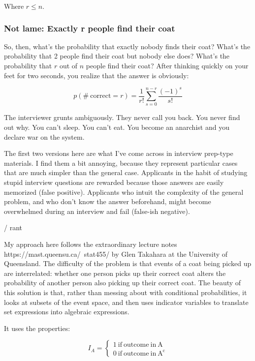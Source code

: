 Where $r\leq n$.

\subsubsection{Not lame: Exactly r people find their coat}
So, then, what's the probability that exactly nobody finds their coat? What's the probability that 2 people find their coat but nobody else does? What's the probability that $r$ out of $n$ people find their coat? After thinking quickly on your feet for two seconds, you realize that the answer is obviously:

\begin{equation}
p(\mathrm{\#\ correct} = r) = \frac{1}{r!}\sum_{s=0}^{n-r} \frac{(-1)^s}{s!}
\end{equation}

The interviewer grunts ambiguously. They never call you back. You never find out why. You can't sleep. You can't eat. You become an anarchist and you declare war on the system.

The first two versions here are what I've come across in interview prep-type materials. I find them a bit annoying, because they represent particular cases that are much simpler than the general case. Applicants in the habit of studying stupid interview questions are rewarded because those answers are easily memorized (false positive). Applicants who intuit the complexity of the general problem, and who don't know the answer beforehand, might become overwhelmed during an interview and fail (false-ish negative).

/ rant

My approach here follows the extraordinary lecture notes https://mast.queensu.ca/~stat455/ by Glen Takahara at the University of Queensland. The difficulty of the problem is that events of a coat being picked up are interrelated: whether one person picks up their correct coat alters the probability of another person also picking up their correct coat. The beauty of this solution is that, rather than messing about with conditional probabilities, it looks at subsets of the event space, and then uses indicator variables to translate set expressions into algebraic expressions.

It uses the properties:

\begin{equation}
I_A = \left\{\begin{array}{l} 1 \mathrm{\ if\ outcome\ in\ A}\\0 \mathrm{\ if\ outcome\ in\ A^c} \end{array}\right.
\end{equation}

